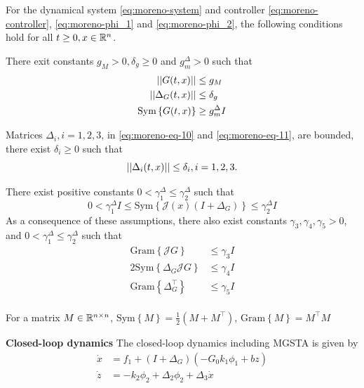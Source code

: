 For the dynamical system \eqref{eq:moreno-system} and controller \eqref{eq:moreno-controller}, \eqref{eq:moreno-phi_1} and \eqref{eq:moreno-phi_2}, the following conditions hold for all $t \geq 0, x \in \mathbb{R}^n$.
\begin{assumption}
    There exit constants $g_M > 0, \delta_g \geq 0$ and $g_m^\Delta > 0$ such that
            \begin{equation}
                \begin{split}
                    \lvert\lvert G(t, x)\rvert\rvert &\leq g_M \\
                    \lvert\lvert\Delta_G(t, x)\rvert\rvert &\leq \delta_g \\
                    \text{Sym}\left\{G(t, x)\right\} &\geq g_m^\Delta I
                \end{split}
            \end{equation}
\end{assumption}
\begin{assumption}
    Matrices $\Delta_i, i=1,2,3$, in \eqref{eq:moreno-eq-10} and \eqref{eq:moreno-eq-11}, are bounded, there exist $\delta_i \geq 0$ such that 
            \begin{equation*}
                \lvert\lvert\Delta_i(t,x)\rvert\rvert \leq \delta_i, i = 1,2,3.
            \end{equation*}
\end{assumption}
\begin{assumption}
    There exist positive constants $0 < \gamma_1^\Delta \leq \gamma_2^\Delta$ such that 
            \begin{equation}
                0 < \gamma_1^\Delta I \leq \text{Sym} \left\{\mathcal{J}(x)\left(I + \Delta_G\right)\right\} \leq \gamma_2^\Delta I
            \end{equation}
            As a consequence of these assumptions, there also exist constants $\gamma_3,\gamma_4,\gamma_5 > 0$, and $0 < \gamma_1^\Delta \leq\gamma_2^\Delta$ such that 
            \begin{equation}
                \begin{split}
                    \text{Gram}\left\{\mathcal{J}G\right\} &\leq \gamma_3 I \\
                    2\text{Sym}\left\{\Delta_G\mathcal{J}G\right\} &\leq \gamma_4 I \\
                    \text{Gram}\left\{\Delta_G^\top\right\} &\leq \gamma_5 I \\
                \end{split}
            \end{equation}
\end{assumption}
\begin{rmk}
    For a matrix $M \in \mathbb{R}^{n \times n}$, $\text{Sym}\left\{M\right\} = \frac{1}{2}(M + M^\top)$, $\text{Gram}\left\{M\right\} = M^\top M$
\end{rmk}
\textbf{Closed-loop dynamics}
The closed-loop dynamics including MGSTA is given by
\begin{align}
    \dot{x} &= f_1 + \left(I + \Delta_G\right)\left(-G_0k_1\phi_1 + bz\right) \\
    \dot{z} &= -k_2\phi_2 + \Delta_2\phi_2+\Delta_3 \dot{x}
\end{align}


